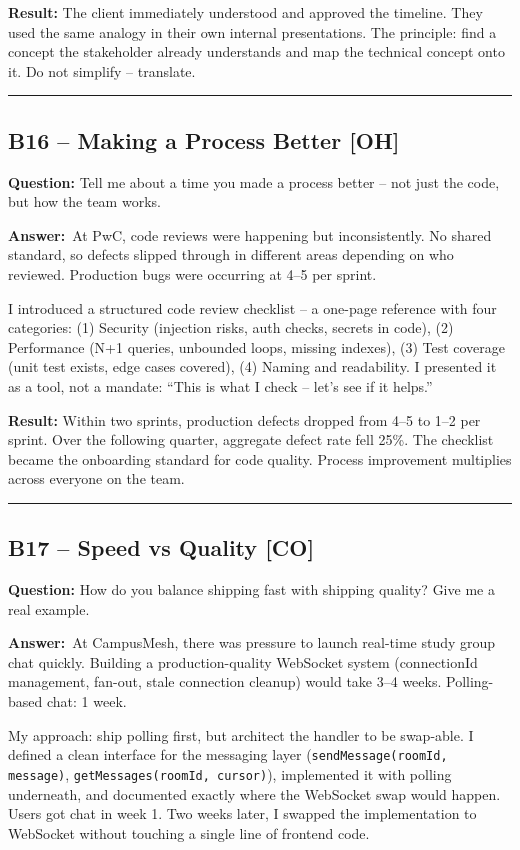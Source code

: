\documentclass[letterpaper,10pt]{article}
\newlength{\boxwidth}
\newcommand{\bquestionbox}[1]{%
  \vspace{6pt}%
  \noindent\colorbox{bqbg}{%
    \begin{minipage}{\boxwidth}%
      \vspace{3pt}\textbf{\textcolor{orange!70!black}{Question:}} #1\vspace{3pt}%
    \end{minipage}%
  }\vspace{2pt}%
}
\newcommand{\answerlabel}{\noindent\textbf{\textcolor{answerblue}{Answer:}}~}
\begin{document}
\textbf{Result:} The client immediately understood and approved the timeline. They used the same analogy in their own internal presentations. The principle: find a concept the stakeholder already understands and map the technical concept onto it. Do not simplify -- translate.

\rule{\linewidth}{0.2pt}

\subsection*{B16 -- Making a Process Better \textmd{[OH]}}

\bquestionbox{Tell me about a time you made a process better -- not just the code, but how the team works.}

\answerlabel At PwC, code reviews were happening but inconsistently. No shared standard, so defects slipped through in different areas depending on who reviewed. Production bugs were occurring at 4--5 per sprint.

I introduced a structured code review checklist -- a one-page reference with four categories: (1) Security (injection risks, auth checks, secrets in code), (2) Performance (N+1 queries, unbounded loops, missing indexes), (3) Test coverage (unit test exists, edge cases covered), (4) Naming and readability. I presented it as a tool, not a mandate: ``This is what I check -- let's see if it helps.''

\textbf{Result:} Within two sprints, production defects dropped from 4--5 to 1--2 per sprint. Over the following quarter, aggregate defect rate fell 25\%. The checklist became the onboarding standard for code quality. Process improvement multiplies across everyone on the team.

\rule{\linewidth}{0.2pt}

\subsection*{B17 -- Speed vs Quality \textmd{[CO]}}

\bquestionbox{How do you balance shipping fast with shipping quality? Give me a real example.}

\answerlabel At CampusMesh, there was pressure to launch real-time study group chat quickly. Building a production-quality WebSocket system (connectionId management, fan-out, stale connection cleanup) would take 3--4 weeks. Polling-based chat: 1 week.

My approach: ship polling first, but architect the handler to be swap-able. I defined a clean interface for the messaging layer (\texttt{sendMessage(roomId, message)}, \texttt{getMessages(roomId, cursor)}), implemented it with polling underneath, and documented exactly where the WebSocket swap would happen. Users got chat in week 1. Two weeks later, I swapped the implementation to WebSocket without touching a single line of frontend code.
\end{document}
